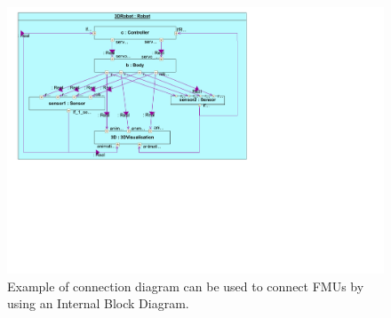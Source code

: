 \begin{figure}[bt]
\centering
\includegraphics[width=.7\columnwidth]{Images/sysml_connection_diagram_v2.pdf}
\caption{Example of connection diagram can be used to connect FMUs by using an Internal Block Diagram.}
\label{fig:semantic_adaptations}
\end{figure}

